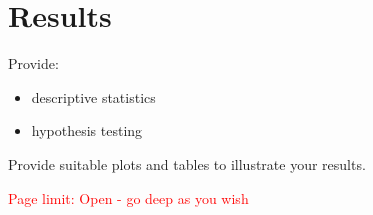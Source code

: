 \section{Results}
Provide:
\begin{itemize}
\item descriptive statistics
\item hypothesis testing
\end{itemize}
Provide suitable plots and tables to illustrate your results.

\textcolor{red}{Page limit: Open - go deep as you wish}